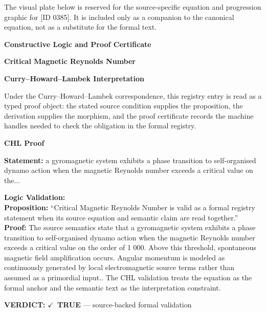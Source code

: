 \begingroup\footnotesize\sloppy
The visual plate below is reserved for the source-specific equation and progression graphic for [ID 0385]. It is included only as a companion to the canonical equation, not as a substitute for the formal text.
\par\endgroup
\ifTZPDarkEdition
{}
\fi

\clearpage
\begingroup\tzpsupportsetup
\noindent\textbf{\fontsize{10.8pt}{12.8pt}\selectfont [ID 0385] Constructive Logic and Proof Certificate}\par
\noindent\textbf{\fontsize{10pt}{12pt}\selectfont Critical Magnetic Reynolds Number}\par
\vspace{0.45em}
\begingroup
\footnotesize
\setlength{\parskip}{0.22em}
\setlength{\parindent}{0pt}
\noindent\textbf{Curry--Howard--Lambek Interpretation}\par
Under the Curry--Howard--Lambek correspondence, this registry entry is read as a typed proof
object: the stated source condition supplies the proposition, the derivation supplies the
morphism, and the proof certificate records the machine handles needed to check the obligation
in the formal registry.

\vspace{0.45em}
\noindent\textbf{CHL Proof}\par
\textbf{Statement:} a gyromagnetic system exhibits a phase transition to self-organised dynamo action when
the magnetic Reynolds number exceeds a critical value on the...

\textbf{Logic Validation:}\\
\textbf{Proposition:} ``Critical Magnetic Reynolds Number is valid as a formal registry statement when its
source equation and semantic claim are read together.''\\
\textbf{Proof:} The source semantics state that a gyromagnetic system exhibits a phase transition to
self-organised dynamo action when the magnetic Reynolds number exceeds a critical value
on the order of 1 000. Above this threshold, spontaneous magnetic field amplification
occurs. Angular momentum is modeled as continuously generated by local electromagnetic
source terms rather than assumed as a primordial input.. The CHL validation treats the
equation as the formal anchor and the semantic text as the interpretation constraint.

\textbf{VERDICT:} \ensuremath{\checkmark}\ \textbf{TRUE} --- source-backed formal validation


